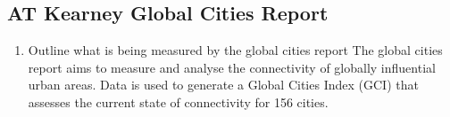 	\subsection{AT Kearney Global Cities Report}
		\begin{enumerate}
			\item Outline what is being measured by the global cities report
				\subitem The global cities report aims to measure and analyse the connectivity of globally influential urban areas. Data is used to generate a Global Cities Index (GCI) that assesses the current state of connectivity for 156 cities.
		\end{enumerate}